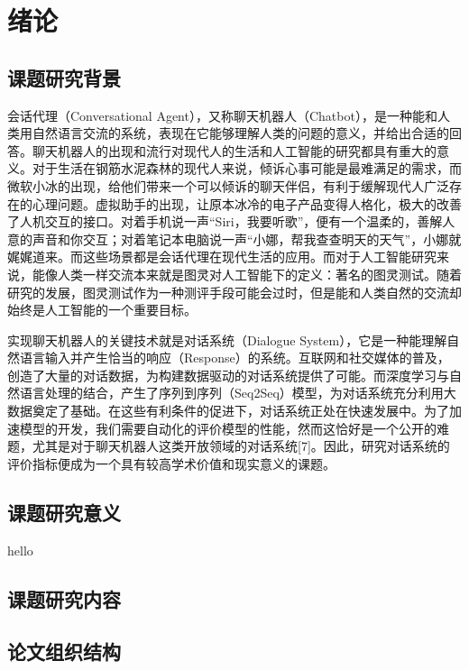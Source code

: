 
\chapter{绪论}\label{ch:绪论}

\section{课题研究背景}
会话代理（Conversational Agent），又称聊天机器人（Chatbot），是一种能和人类用自然语言交流的系统，表现在它能够理解人类的问题的意义，并给出合适的回答。聊天机器人的出现和流行对现代人的生活和人工智能的研究都具有重大的意义。对于生活在钢筋水泥森林的现代人来说，倾诉心事可能是最难满足的需求，而微软小冰的出现，给他们带来一个可以倾诉的聊天伴侣，有利于缓解现代人广泛存在的心理问题。虚拟助手的出现，让原本冰冷的电子产品变得人格化，极大的改善了人机交互的接口。对着手机说一声“Siri，我要听歌”，便有一个温柔的，善解人意的声音和你交互；对着笔记本电脑说一声“小娜，帮我查查明天的天气”，小娜就娓娓道来。而这些场景都是会话代理在现代生活的应用。而对于人工智能研究来说，能像人类一样交流本来就是图灵对人工智能下的定义：著名的图灵测试。随着研究的发展，图灵测试作为一种测评手段可能会过时，但是能和人类自然的交流却始终是人工智能的一个重要目标。

实现聊天机器人的关键技术就是对话系统（Dialogue System），它是一种能理解自然语言输入并产生恰当的响应（Response）的系统。互联网和社交媒体的普及，创造了大量的对话数据，为构建数据驱动的对话系统提供了可能。而深度学习与自然语言处理的结合，产生了序列到序列（Seq2Seq）模型，为对话系统充分利用大数据奠定了基础。在这些有利条件的促进下，对话系统正处在快速发展中。为了加速模型的开发，我们需要自动化的评价模型的性能，然而这恰好是一个公开的难题，尤其是对于聊天机器人这类开放领域的对话系统[7]。因此，研究对话系统的评价指标便成为一个具有较高学术价值和现实意义的课题。

\section{课题研究意义}
hello

\section{课题研究内容}


\section{论文组织结构}

